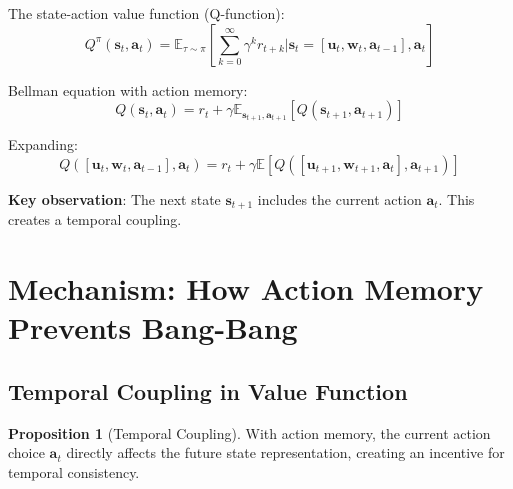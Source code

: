 \documentclass[11pt,a4paper]{article}
\newcommand{\E}{\mathbb{E}}
\theoremstyle{definition}
\newtheorem{proposition}{Proposition}
\begin{document}
The state-action value function (Q-function):
\begin{equation}
    Q^\pi(\mathbf{s}_t, \mathbf{a}_t) = \E_{\tau \sim \pi}\left[\sum_{k=0}^\infty \gamma^k r_{t+k} \Big| \mathbf{s}_t = [\mathbf{u}_t, \mathbf{w}_t, \mathbf{a}_{t-1}], \mathbf{a}_t \right]
\end{equation}

Bellman equation with action memory:
\begin{equation}
    Q(\mathbf{s}_t, \mathbf{a}_t) = r_t + \gamma \E_{\mathbf{s}_{t+1}, \mathbf{a}_{t+1}}\left[Q(\mathbf{s}_{t+1}, \mathbf{a}_{t+1})\right]
\end{equation}

Expanding:
\begin{equation}
    Q([\mathbf{u}_t, \mathbf{w}_t, \mathbf{a}_{t-1}], \mathbf{a}_t) = r_t + \gamma \E\left[Q([\mathbf{u}_{t+1}, \mathbf{w}_{t+1}, \mathbf{a}_t], \mathbf{a}_{t+1})\right]
\end{equation}

\textbf{Key observation}: The next state $\mathbf{s}_{t+1}$ includes the current action $\mathbf{a}_t$. This creates a temporal coupling.

\section{Mechanism: How Action Memory Prevents Bang-Bang}

\subsection{Temporal Coupling in Value Function}

\begin{proposition}[Temporal Coupling]
With action memory, the current action choice $\mathbf{a}_t$ directly affects the future state representation, creating an incentive for temporal consistency.
\end{proposition}
\end{document}
